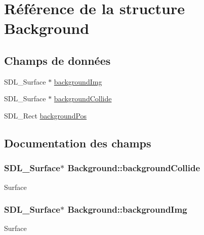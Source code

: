 \hypertarget{structBackground}{}\section{Référence de la structure Background}
\label{structBackground}
\subsection*{Champs de données}
\begin{DoxyCompactItemize}
\item 
S\+D\+L\+\_\+\+Surface $\ast$ \hyperlink{structBackground_ade7f4649cb1e02ab75167ce898db884c}{background\+Img}
\item 
S\+D\+L\+\_\+\+Surface $\ast$ \hyperlink{structBackground_a4cb0dbd29ce5c40b49b97e5952f84b2f}{background\+Collide}
\item 
S\+D\+L\+\_\+\+Rect \hyperlink{structBackground_a81fdaea521be13c6634186f72b105e33}{background\+Pos}
\end{DoxyCompactItemize}


\subsection{Documentation des champs}
\subsubsection[{\texorpdfstring{background\+Collide}{backgroundCollide}}]{\setlength{\rightskip}{0pt plus 5cm}S\+D\+L\+\_\+\+Surface$\ast$ Background\+::background\+Collide}\hypertarget{structBackground_a4cb0dbd29ce5c40b49b97e5952f84b2f}{}\label{structBackground_a4cb0dbd29ce5c40b49b97e5952f84b2f}
Surface 
\subsubsection[{\texorpdfstring{background\+Img}{backgroundImg}}]{\setlength{\rightskip}{0pt plus 5cm}S\+D\+L\+\_\+\+Surface$\ast$ Background\+::background\+Img}\hypertarget{structBackground_ade7f4649cb1e02ab75167ce898db884c}{}\label{structBackground_ade7f4649cb1e02ab75167ce898db884c}
Surface 
